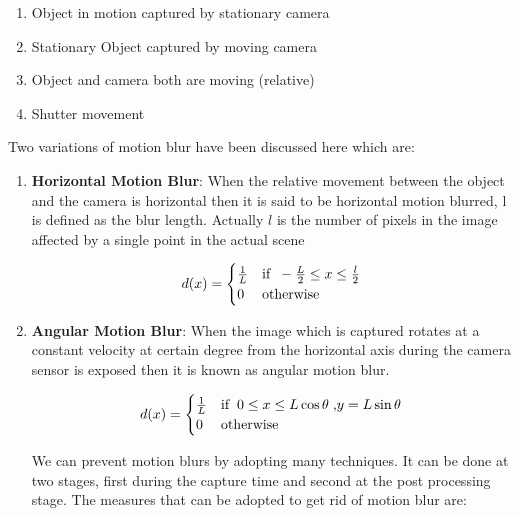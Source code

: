 \documentclass{article}
\begin{document}
\begin{enumerate}
    \item Object in motion captured by stationary camera
    \item Stationary Object captured by moving camera
    \item Object and camera both are moving (relative)
    \item Shutter movement
\end{enumerate}

Two variations of motion blur have been discussed here which are: 

\begin{enumerate}
    \item \textbf{Horizontal Motion Blur}: When the relative movement between the object and the camera is horizontal then it is said to be horizontal motion blurred, l is defined as the blur length. Actually $l$ is the number of pixels in the image affected by a single point in the actual scene \cite{chang-mm}
    
    \begin{align}
        d(x) = \begin{cases}
            \frac{1}{L} & \text{if} \hspace{.2cm} -\frac{L}{2} \leq x \leq \frac{l}{2} \\
            0 & \text{otherwise}
        \end{cases}
    \end{align}
    
    \item \textbf{Angular Motion Blur}: When the image which is captured rotates at a constant velocity at certain degree from the horizontal axis during the camera sensor is exposed then it is known as angular motion blur.
    
    \begin{align}
        d(x) = \begin{cases}
            \frac{1}{L} & \text{if} \hspace{.2cm} 0 \leq x \leq L \cos{\theta} \hspace{.1cm} \text{,} y = L \sin{\theta} \\
            0 & \text{otherwise}
        \end{cases}
    \end{align}
    
    We can prevent motion blurs by adopting many techniques. It can be done at two stages, first during the capture time and second at the post processing stage. The measures that can be adopted to get rid of motion blur are: 
    

\end{enumerate}
\end{document}
